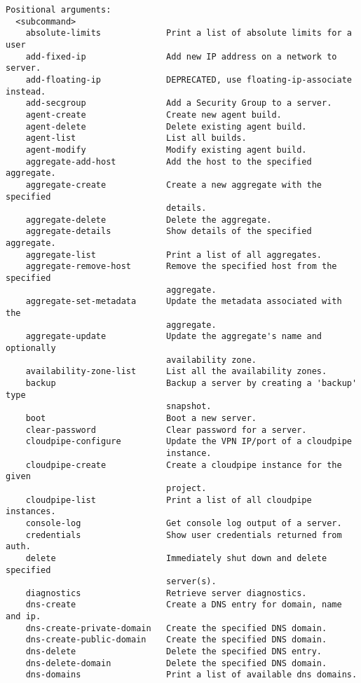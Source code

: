 \documentclass[a4paper,left=1.5cm,right=1.5cm,11pt]{article}
\begin{document}
\begin{lstlisting}
Positional arguments:
  <subcommand>
    absolute-limits             Print a list of absolute limits for a user
    add-fixed-ip                Add new IP address on a network to server.
    add-floating-ip             DEPRECATED, use floating-ip-associate instead.
    add-secgroup                Add a Security Group to a server.
    agent-create                Create new agent build.
    agent-delete                Delete existing agent build.
    agent-list                  List all builds.
    agent-modify                Modify existing agent build.
    aggregate-add-host          Add the host to the specified aggregate.
    aggregate-create            Create a new aggregate with the specified
                                details.
    aggregate-delete            Delete the aggregate.
    aggregate-details           Show details of the specified aggregate.
    aggregate-list              Print a list of all aggregates.
    aggregate-remove-host       Remove the specified host from the specified
                                aggregate.
    aggregate-set-metadata      Update the metadata associated with the
                                aggregate.
    aggregate-update            Update the aggregate's name and optionally
                                availability zone.
    availability-zone-list      List all the availability zones.
    backup                      Backup a server by creating a 'backup' type
                                snapshot.
    boot                        Boot a new server.
    clear-password              Clear password for a server.
    cloudpipe-configure         Update the VPN IP/port of a cloudpipe
                                instance.
    cloudpipe-create            Create a cloudpipe instance for the given
                                project.
    cloudpipe-list              Print a list of all cloudpipe instances.
    console-log                 Get console log output of a server.
    credentials                 Show user credentials returned from auth.
    delete                      Immediately shut down and delete specified
                                server(s).
    diagnostics                 Retrieve server diagnostics.
    dns-create                  Create a DNS entry for domain, name and ip.
    dns-create-private-domain   Create the specified DNS domain.
    dns-create-public-domain    Create the specified DNS domain.
    dns-delete                  Delete the specified DNS entry.
    dns-delete-domain           Delete the specified DNS domain.
    dns-domains                 Print a list of available dns domains.

\end{lstlisting}
\end{document}
